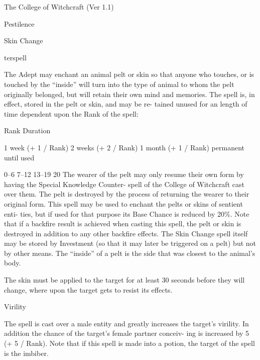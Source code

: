 \begin{Chapter}{The College of Witchcraft (Ver 1.1)}
\begin{spell}[S-16]{Pestilence }
\begin{effects}
\end{effects}
\end{spell}

\begin{spell}[S-17]{Skin Change }


terspell 
\begin{effects}
 The  Adept  may  enchant  an  animal  pelt  or 
skin so that anyone  who touches, or  is touched by 
the  “inside”  will  turn  into  the  type  of  animal  to 
whom  the  pelt  originally  belonged,  but  will  retain 
their  own  mind  and  memories.  The  spell  is,  in 
effect,  stored  in  the  pelt  or  skin,  and  may  be  re-
tained unused for an length of time dependent upon 
the Rank of the spell: 

Rank  Duration 

1 week (+ 1 / Rank) 
2 weeks (+ 2 / Rank) 
1 month (+ 1 / Rank) 
permanent until used 

0–6 
7–12 
13–19 
20 
The wearer of the pelt may only resume their own 
form  by  having  the  Special  Knowledge  Counter-
spell  of  the  College  of  Witchcraft  cast  over  them. 
The  pelt  is  destroyed  by  the  process  of  returning 
the wearer to their original form. This spell may be 
used  to  enchant  the  pelts  or  skins  of  sentient  enti-
ties, but if used for that purpose its Base Chance is 
reduced  by  20\%.  Note  that  if  a  backfire  result  is 
achieved when casting this spell, the pelt or skin is 
destroyed in addition to any other backfire effects. 
The  Skin  Change  spell  itself  may  be  stored  by 
Investment  (so  that  it  may  later  be  triggered  on  a 
pelt) but not by other means. The “inside” of a pelt 
is the side that was closest to the animal’s body. 

The  skin  must  be  applied  to  the  target  for  at  least 
30  seconds  before  they  will  change,  where  upon 
the target gets to resist its effects. 

\end{effects}
\end{spell}

\begin{spell}[S-18]{Virility }

\begin{effects}
 The  spell  is  cast  over  a  male  entity  and 
greatly  increases  the  target’s  virility.  In  addition 
the  chance  of  the  target’s  female  partner  conceiv-
ing is increased by 5 (+ 5 / Rank). Note that if this 
spell is made into a potion, the target of the spell is 
the imbiber. 


\end{effects}
\end{spell}
\end{Chapter}
